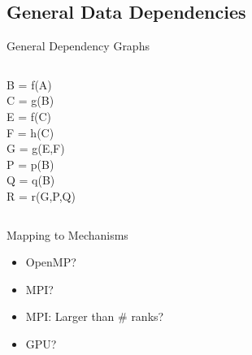 \documentclass[english,compress]{beamer}
\begin{document}
\subsection[General]{General Data Dependencies}
\begin{frame}{General Dependency Graphs}
  \begin{columns}
      B = f(A)\\
      C = g(B)\\
      E = f(C)\\
      F = h(C)\\
      G = g(E,F)\\
      P = p(B)\\
      Q = q(B)\\
      R = r(G,P,Q)
      \begin{center}
        
      \end{center}
  \end{columns}
\end{frame}
\begin{frame}{Mapping to Mechanisms}
  \begin{itemize}[<+->]
    \item OpenMP?
    \item MPI?
    \item MPI: Larger than \# ranks?
    \item GPU?
  \end{itemize}
\end{frame}
\end{document}
